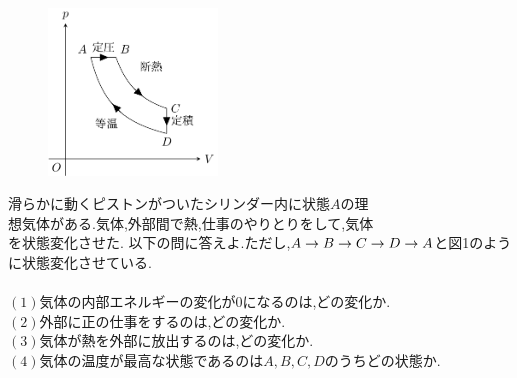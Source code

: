\documentclass[dvipdfmx]{jsarticle}
\begin{document}
\begin{figure}
  \centering
  \includegraphics[keepaspectratio,width=45mm]{./req.png}
  \caption{}
  \label{graph}
\end{figure}

滑らかに動くピストンがついたシリンダー内に状態$A$の理\\
想気体がある.気体,外部間で熱,仕事のやりとりをして,気体\\
を状態変化させた.
以下の問に答えよ.ただし,$A \rightarrow B \rightarrow C \rightarrow \\
D \rightarrow A$と図1のように状態変化させている.\\ \\
$(1)$気体の内部エネルギーの変化が$0$になるのは,どの変化か.\\
$(2)$外部に正の仕事をするのは,どの変化か.\\
$(3)$気体が熱を外部に放出するのは,どの変化か.\\
$(4)$気体の温度が最高な状態であるのは$A,B,C,D$のうちどの状態か.\\
\end{document}
